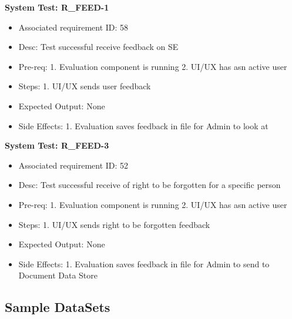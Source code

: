 \textbf{System Test: R\_FEED-1}
\begin{itemize}
    \item Associated requirement ID: 58
    \item Desc: Test successful receive feedback on SE
    \item Pre-req: 1. Evaluation component is running 2. UI/UX has asn active user
    \item Steps: 1. UI/UX sends user feedback
    \item Expected Output: None
    \item Side Effects: 1. Evaluation saves feedback in file for Admin to look at
\end{itemize}

\smallskip

\textbf{System Test: R\_FEED-3}
\begin{itemize}
    \item Associated requirement ID: 52
    \item Desc: Test successful receive of right to be forgotten for a specific person
    \item Pre-req: 1. Evaluation component is running 2. UI/UX has asn active user
    \item Steps: 1. UI/UX sends right to be forgotten feedback
    \item Expected Output: None
    \item Side Effects: 1. Evaluation saves feedback in file for Admin to send to Document Data Store
\end{itemize}

\subsection*{Sample DataSets}

